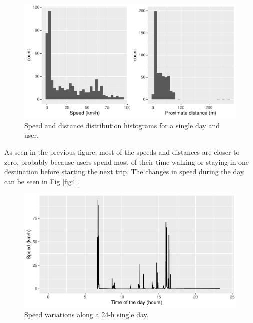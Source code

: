 \documentclass[runningheads]{llncs}
\begin{document}
\begin{figure}

{\centering \includegraphics{conlatex_files/figure-latex/speed-distance-1} 

}

\caption{\label{fig3} Speed and distance distribution histograms for a single day and user.}\label{fig:speed-distance}
\end{figure}

As seen in the previous figure, most of the speeds and distances are closer to zero, probably because users spend most of their time walking or staying in one destination before starting the next trip. The changes in speed during the day can be seen in Fig \ref{fig4}.

\begin{figure}

{\centering \includegraphics{conlatex_files/figure-latex/speed-hour-plot-1} 

}

\caption{\label{fig4}Speed variations along a 24-h single day.}\label{fig:speed-hour-plot}
\end{figure}
\end{document}
